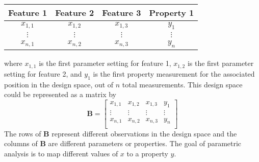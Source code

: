 \begin{center}
\begin{tabular}{c|c|c|c} 
	Feature 1 & Feature 2 & Feature 3 & Property 1 \\ \hline
	$x_{1,1}$ & $x_{1,2}$ & $x_{1,3}$ & $y_{1}$ \\
	$\vdots$ & $\vdots$ & $\vdots$ & $\vdots$ \\
	$x_{n,1}$ & $x_{n,2}$ & $x_{n,3}$ & $y_{n}$ \\
\end{tabular}
\end{center}
where $x_{1,1}$ is the first parameter setting for feature 1, $x_{1,2}$ is the first parameter setting for feature 2, and $y_1$ is the first property measurement for the associated position in the design space, out of $n$ total measurements. This design space could be represented as a matrix by
\begin{equation}
	\mathbf{B} = \begin{bmatrix}
		x_{1,1} & x_{1,2} & x_{1,3} & y_{1} \\
		\vdots & \vdots & \vdots & \vdots \\
		x_{n,1} & x_{n,2} & x_{n,3} & y_{n} \\
	\label{Bmatrix}
	\end{bmatrix}
\end{equation}
The rows of $\mathbf{B}$ represent different observations in the design space and the columns of $\mathbf{B}$ are different parameters or properties. The goal of parametric analysis is to map different values of $x$ to a property $y$. 

